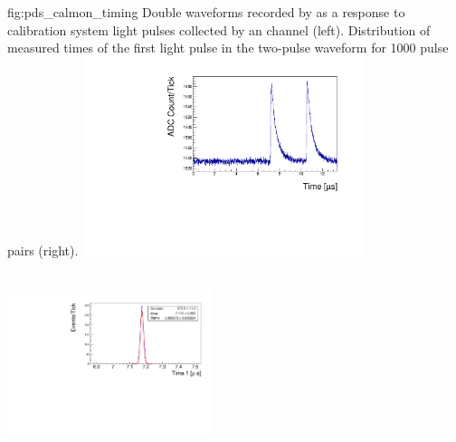 \begin{dunefigure}
 {fig:pds_calmon_timing}
 {Double waveforms recorded by   as a response to calibration system light pulses collected by an  channel (left). Distribution of measured times of the first light pulse in the two-pulse waveform for 1000 pulse pairs (right).}
  \includegraphics[height=5.8cm,width=0.45\linewidth]{graphics/pds-double-waveform-arapuca-example.pdf}
 \includegraphics[height=6cm,width=0.45\textwidth]{graphics/pds-example-t1.pdf}  \end{dunefigure}

